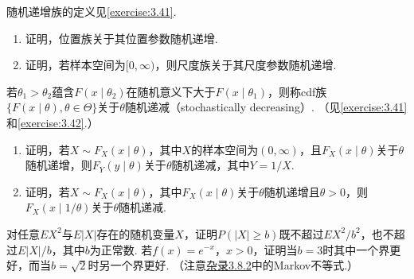 \begin{exercise}\label{exercise:3.42}
随机递增族的定义见\autoref{exercise:3.41}.
\begin{enumerate}
\item[(a)] 证明，位置族关于其位置参数随机递增.
\item[(b)] 证明，若样本空间为$[0,\infty)$，则尺度族关于其尺度参数随机递增.
\end{enumerate}
\end{exercise}
\begin{exercise}\label{exercise:3.43}
若$\theta_1>\theta_2$蕴含$F(x\mid\theta_2)$在随机意义下大于$F(x\mid\theta_1)$，则称cdf族$\{F(x\mid\theta),\theta\in\Theta\}$关于$\theta$随机递减（stochastically decreasing）. （见\autoref{exercise:3.41}和\autoref{exercise:3.42}.）
\begin{enumerate}
\item[(a)] 证明，若$X\sim F_X(x\mid\theta)$，其中$X$的样本空间为$(0,\infty)$，且$F_X(x\mid\theta)$关于$\theta$随机递增，则$F_Y(y\mid\theta)$关于$\theta$随机递减，其中$Y=1/X$.
\item[(b)] 证明，若$X\sim F_X(x\mid\theta)$，其中$F_X(x\mid\theta)$关于$\theta$随机递增且$\theta>0$，则$F_X(x\mid1/\theta)$关于$\theta$随机递减.
\end{enumerate}
\end{exercise}
\begin{exercise}\label{exercise:3.44}
对任意$EX^2$与$E|X|$存在的随机变量$X$，证明$P(|X|\ge b)$既不超过$EX^2/b^2$，也不超过$E|X|/b$，其中$b$为正常数. 若$f(x)=e^{-x}$，$x>0$，证明当$b=3$时其中一个界更好，而当$b=\sqrt2$时另一个界更好. （注意\hyperref[sec:3.8.2]{杂录3.8.2}中的Markov不等式.）
\end{exercise}

